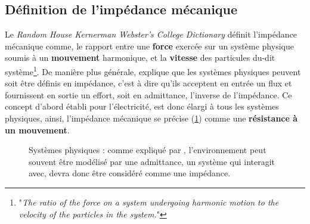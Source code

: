 \begin{appendices}
	\newpage	
	\section{Définition de l'impédance mécanique} \label{app_mechanical_impedance}
	
	Le \textit{Random House Kernerman Webster's College Dictionary} définit l'impédance mécanique comme, le rapport entre une \textbf{force} exercée sur un système physique soumis à un \textbf{mouvement} harmonique, et la \textbf{vitesse} des particules du-dit système\footnote{"\textit{The ratio of the force on a system undergoing harmonic motion to the velocity of the particles in the system.}"}. De manière plus générale, \cite{hogan_impedance_1985} explique que les systèmes physiques peuvent soit être définis en impédance, c'est à dire qu'ils acceptent en entrée un flux et fournissent en sortie un effort, soit en admittance, l'inverse de l'impédance. Ce concept d'abord établi pour l'électricité, est donc élargi à tous les systèmes physiques, ainsi, l'impédance mécanique se précise (\cref{fig_mech_impedance}) comme une \textbf{résistance à un mouvement}.
	
	\begin{figure}[h]
		\centering
		
		
		\caption{Systèmes physiques : comme expliqué par \cite{hogan_impedance_1985}, l'environnement peut souvent être modélisé par une admittance, un système qui interagit avec, devra donc être considéré comme une impédance.} %
		\label{fig_mech_impedance} %
	\end{figure}
	

\end{appendices}
